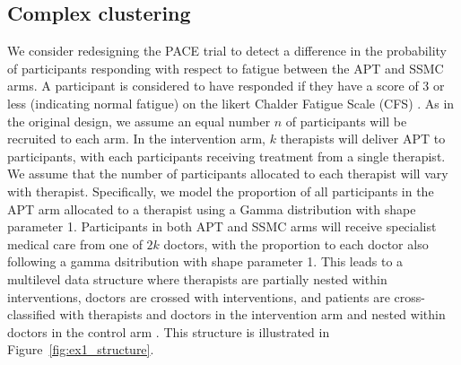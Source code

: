 \documentclass[]{sagej}
\begin{document}
\subsection{Complex clustering}\label{sec:ex1}

We consider redesigning the PACE trial to detect a difference in the probability of participants responding with respect to fatigue between the APT and SSMC arms. A participant is considered to have responded if they have a score of 3 or less (indicating normal fatigue) on the likert Chalder Fatigue Scale (CFS) \cite{Chalder1993}. As in the original design, we assume an equal number $n$ of participants will be recruited to each arm. In the intervention arm, $k$ therapists will deliver APT to participants, with each participants receiving treatment from a single therapist. We assume that the number of participants allocated to each therapist will vary with therapist. Specifically, we model the proportion of all participants in the APT arm allocated to a therapist using a Gamma distribution with shape parameter 1. Participants in both APT and SSMC arms will receive specialist medical care from one of $2k$ doctors, with the proportion to each doctor also following a gamma dsitribution with shape parameter 1. This leads to a multilevel data structure where therapists are partially nested within interventions, doctors are crossed with interventions, and patients are cross-classified with therapists and doctors in the intervention arm and nested within doctors in the control arm \cite{Walwyn2010}. This structure is illustrated in Figure~\ref{fig:ex1_structure}.
\end{document}
